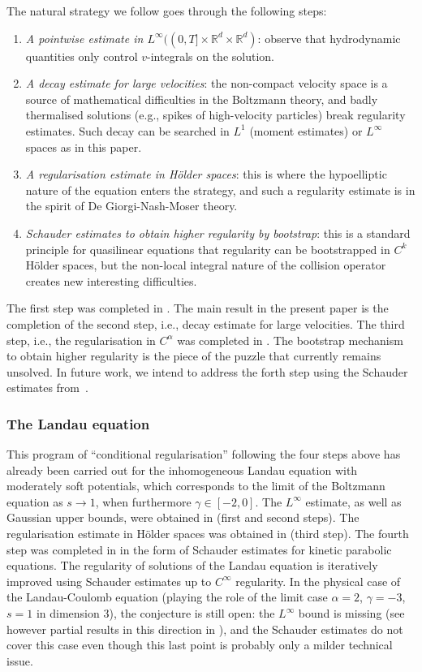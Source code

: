\documentclass[11pt]{article}
\newcommand{\ie}{i.e.,\xspace}
\newcommand{\eg}{e.g.,\xspace}
\theoremstyle{plain}
\theoremstyle{definition}
\numberwithin{equation}{section}
\newcommand{\R}{\mathbb R}
\begin{document}
The natural strategy we follow goes through the following steps:
\begin{enumerate}
\item \emph{A pointwise estimate in
$L^\infty((0,T] \times \R^d \times \R^d)$}: observe that hydrodynamic
quantities only control $v$-integrals on the solution.
\item \emph{A decay estimate for large velocities}: the non-compact
velocity space is a source of mathematical difficulties in the
Boltzmann theory, and badly thermalised solutions (\eg spikes of
high-velocity particles) break regularity estimates. Such decay can
be searched in $L^1$ (moment estimates) or $L^\infty$ spaces as in
this paper.
\item \emph{A regularisation estimate in Hölder spaces}: this is
where the hypoelliptic nature of the equation enters the strategy,
and such a regularity estimate is in the spirit of De
Giorgi-Nash-Moser theory.
\item \emph{Schauder estimates to obtain higher regularity by
bootstrap}: this is a standard principle for quasilinear equations
that regularity can be bootstrapped in $C^{k}$ Hölder spaces, but
the non-local integral nature of the collision operator creates new
interesting difficulties.
\end{enumerate}

The first step was completed in \cite{luis}. The main result in the
present paper is the completion of the second step, \ie decay
estimate for large velocities. The third step, \ie the regularisation
in $C^\alpha$ was completed in \cite{is}. The bootstrap mechanism to
obtain higher regularity is the piece of the puzzle that currently
remains unsolved. In future work, we intend to address the forth step using the Schauder estimates from~\cite{imbert2018schauder}.

\subsubsection{The Landau equation} This program of ``conditional
regularisation'' following the four steps above has already been
carried out for the inhomogeneous Landau equation with moderately soft
potentials, which corresponds to the limit of the Boltzmann equation
as $s \to 1$, when furthermore $\gamma \in [-2,0]$. The $L^\infty$
estimate, as well as Gaussian upper bounds, were obtained in
\cite{css} (first and second steps). The regularisation estimate in
Hölder spaces was obtained in \cite{gimv} (third step). The fourth
step was completed in \cite{henderson2017c} in the form of Schauder
estimates for kinetic parabolic equations. The regularity of solutions
of the Landau equation is iteratively improved using Schauder
estimates up to $C^\infty$ regularity. In the physical case of the
Landau-Coulomb equation (playing the role of the limit case
$\alpha = 2$, $\gamma = -3$, $s=1$ in dimension $3$), the conjecture
is still open: the $L^\infty$ bound is missing (see however partial
results in this direction in \cite{luis-landau}), and the Schauder
estimates \cite{henderson2017c} do not cover this case even though
this last point is probably only a milder technical issue.
\end{document}

